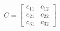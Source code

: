 \documentclass[preview]{standalone}
\begin{document}
\begin{align*}
C = \begin{bmatrix} c_{11} & c_{12} \\ c_{21} & c_{22} \\ c_{31} & c_{32} \end{bmatrix}
\end{align*}
\end{document}
